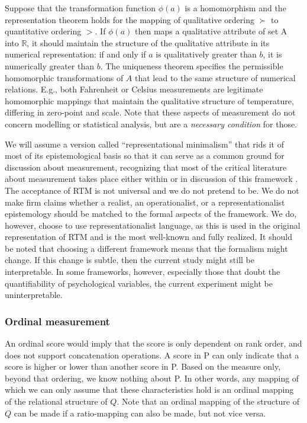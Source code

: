 \documentclass[utf8]{FrontiersinVancouver}
\begin{document}
Suppose that the transformation function $\phi(a)$ is a homomorphism and the representation theorem holds for the mapping of qualitative ordering $\succ$ to quantitative ordering $>$. If $\phi(a)$ then maps a qualitative attribute of set A into $\mathbb{R}$, it should maintain the structure of the qualitative attribute in its numerical representation: if and only if $a$ is qualitatively greater than $b$, it is numerically greater than $b$. The uniqueness theorem specifies the permissible homomorphic transformations of $A$ that lead to the same structure of numerical relations. E.g., both Fahrenheit or Celsius measurements are legitimate homomorphic mappings that maintain the qualitative structure of temperature, differing in zero-point and scale. Note that these aspects of measurement do not concern modelling or statistical analysis, but are a \textit{necessary condition} for those.

We will assume a version called ``representational minimalism'' that rids it of most of its epistemological basis so that it can serve as a common ground for discussion about measurement, recognizing that most of the critical literature about measurement takes place either within or in discussion of this framework \citep{vessonenRepresentationMeasurement2021}. The acceptance of RTM is not universal and we do not pretend to be.  We do not make firm claims whether a realist, an operationalist, or a representationalist epistemology should be matched to the formal aspects of the framework. We do, however, choose to use representationalist language, as this is used in the original representation of RTM and is the most well-known and fully realized. It should be noted that choosing a different framework means that the formalism might change. If this change is subtle, then the current study might still be interpretable. In some frameworks, however, especially those that doubt the quantifiability of psychological variables, the current experiment might be uninterpretable. 

\subsubsection{Ordinal measurement}
An ordinal score would imply that the score is only dependent on rank order, and does not support concatenation operations. A score in P can only indicate that a score is higher or lower than another score in P. Based on the measure only, beyond that ordering, we know nothing about P. In other words, any mapping of which we can only assume that these characteristics hold is an ordinal mapping of the relational structure of $Q$. Note that an ordinal mapping of the structure of $Q$ can be made if a ratio-mapping can also be made, but not vice versa. 
\end{document}
